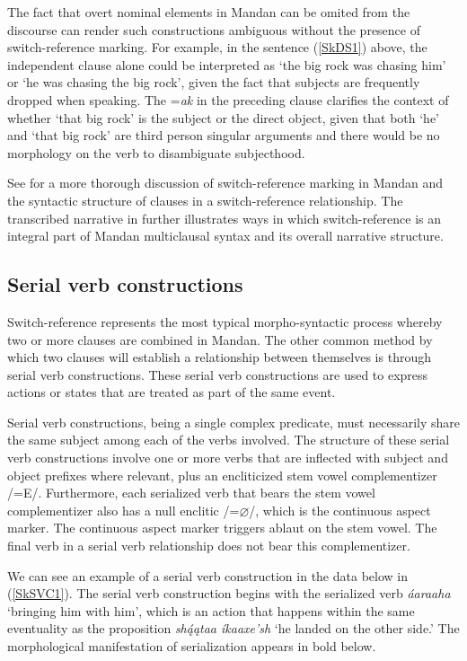 The fact that overt nominal elements in Mandan can be omited from the discourse can render such constructions ambiguous without the presence of switch-reference marking. For example, in the sentence (\ref{SkDS1}) above, the independent clause alone could be interpreted as `the big rock was chasing him' or `he was chasing the big rock', given the fact that subjects are frequently dropped when speaking. The =\textit{ak} in the preceding clause clarifies the context of whether `that big rock' is the subject or the direct object, given that both `he' and `that big rock' are third person singular arguments and there would be no morphology on the verb to disambiguate subjecthood.


See  for a more thorough discussion of switch-reference marking in Mandan and the syntactic structure of clauses in a switch-reference relationship. The transcribed narrative in  further illustrates ways in which switch-reference is an integral part of Mandan multiclausal syntax and its overall narrative structure.

\subsection{Serial verb constructions}\label{SkSVC}

Switch-reference represents the most typical morpho-syntactic process whereby two or more clauses are combined in Mandan. The other common method by which two clauses will establish a relationship between themselves is through serial verb constructions. These serial verb constructions are used to express actions or states that are treated as part of the same event. 

Serial verb constructions, being a single complex predicate, must necessarily share the same subject among each of the verbs involved. The structure of these serial verb constructions involve one or more verbs that are inflected with subject and object prefixes where relevant, plus an encliticized stem vowel complementizer /=E/. Furthermore, each serialized verb that bears the stem vowel complementizer also has a null enclitic /=$\varnothing$/, which is the continuous aspect marker. The continuous aspect marker triggers ablaut on the stem vowel. The final verb in a serial verb relationship does not bear this complementizer. 

We can see an example of a serial verb construction in the data below in (\ref{SkSVC1}). The serial verb construction begins with the serialized verb \textit{áaraaha} `bringing him with him', which is an action that happens within the same eventuality as the proposition \textit{shą́ątaa íkaaxe'sh} `he landed on the other side.' The morphological manifestation of serialization appears in bold below.

